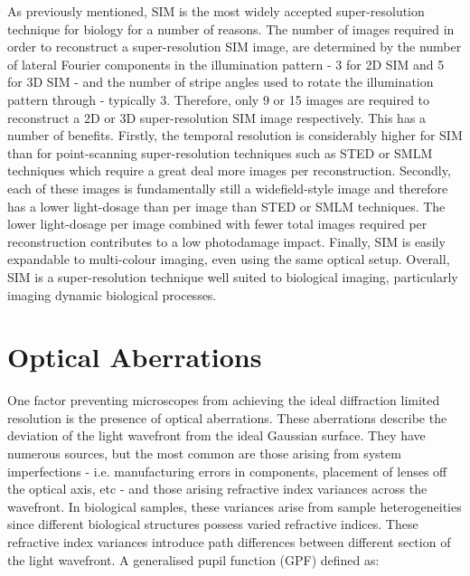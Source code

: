 As previously mentioned, SIM is the most widely accepted 
super-resolution technique for biology for a number of reasons. The 
number of images required in order to reconstruct a super-resolution 
SIM image, are determined by the number of lateral Fourier components 
in the illumination pattern - 3 for 2D SIM and 5 for 3D SIM - and the
number of stripe angles used to rotate the illumination pattern through
- typically 3. Therefore, only 9 or 15 images are required to 
reconstruct a 2D or 3D super-resolution SIM image respectively. This
has a number of benefits. Firstly, the temporal resolution is 
considerably higher for SIM than for point-scanning super-resolution
techniques such as STED or SMLM techniques which require a great deal more 
images per reconstruction\cite{schermelleh2019super,leung2011review}.
Secondly, each of these images is fundamentally still a widefield-style
image and therefore has a lower light-dosage than per image than STED 
or SMLM techniques. The lower light-dosage per image combined with fewer
total images required per reconstruction contributes to a low 
photodamage impact. Finally, SIM is easily expandable to multi-colour 
imaging, even using the same optical 
setup\cite{wu2018faster,allen2014structured}. Overall, SIM is a 
super-resolution technique well suited to biological imaging, 
particularly imaging dynamic biological processes.

\section{Optical Aberrations}
\label{sec:aberrations}

One factor preventing microscopes from achieving the ideal diffraction
limited resolution is the presence of optical 
aberrations\cite{goodman2005introduction,wyant1992basic,wolf1951diffraction}.
These aberrations describe the deviation of the light wavefront
from the ideal Gaussian surface. They have numerous sources, but the most
common are those arising from system imperfections - i.e. manufacturing errors
in components, placement of lenses off the optical axis, etc - and those
arising refractive index variances across the 
wavefront\cite{kubby2013adaptive,booth2007adaptive}. In biological samples, 
these variances arise from sample heterogeneities since different biological
structures possess varied refractive 
indices\cite{bashkatov2011optical, jacques2013optical, kim2010measurement, sandell2011review}.
These refractive index variances introduce path differences between 
different section of the light wavefront. A generalised pupil function 
(GPF) defined as\cite{antonello2014optimisation}:

